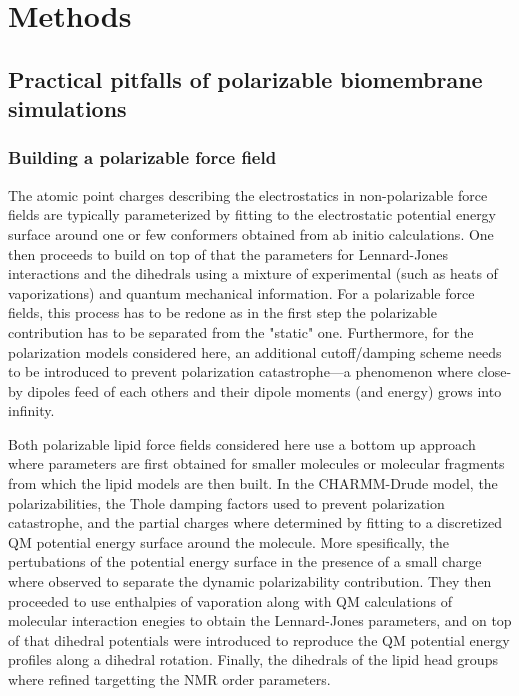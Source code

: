 \documentclass[journal=jacsat,manuscript=article,layout=singlecolumn]{achemso}
\begin{document}
\section{Methods}
\subsection{Practical pitfalls of polarizable biomembrane simulations}


\subsubsection{Building a polarizable force field}

The atomic point charges describing the electrostatics in non-polarizable force fields are typically parameterized by fitting to the electrostatic potential energy surface around one or few conformers obtained from ab initio calculations. One then proceeds to build on top of that the parameters for Lennard-Jones interactions and the dihedrals using a mixture of experimental (such as heats of vaporizations) and quantum mechanical information. For a polarizable force fields, this process has to be redone as in the first step the polarizable contribution has to be separated from the "static" one. Furthermore, for the polarization models considered here, an additional cutoff/damping scheme needs to be introduced to prevent polarization catastrophe---a phenomenon where close-by dipoles feed of each others and their dipole moments (and energy) grows into infinity.

Both polarizable lipid force fields considered here use a bottom up approach where parameters are first obtained for smaller molecules or molecular fragments from which the lipid models are then built.  In the CHARMM-Drude model, the polarizabilities, the Thole damping factors used to prevent polarization catastrophe, and the partial charges where determined by fitting to a discretized QM potential energy surface around the molecule. More spesifically, the pertubations of the potential energy surface in the presence of a small charge where observed to separate the dynamic polarizability contribution. They then proceeded to use enthalpies of vaporation along with QM calculations of molecular interaction enegies to obtain the Lennard-Jones parameters, and on top of that dihedral potentials were introduced to reproduce the QM potential energy profiles along a dihedral rotation. Finally, the dihedrals of the lipid head groups where refined targetting the NMR order parameters.
\end{document}
